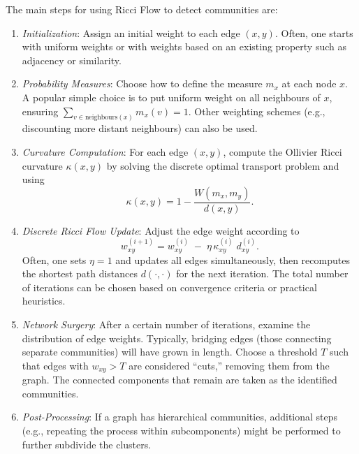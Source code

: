 The main steps for using Ricci Flow to detect communities are:
\begin{enumerate}
    \item \emph{Initialization}: Assign an initial weight to each edge $(x,y)$. Often, one starts with uniform weights or with weights based on an existing property such as adjacency or similarity.
    \item \emph{Probability Measures}: Choose how to define the measure $m_x$ at each node $x$. A popular simple choice is to put uniform weight on all neighbours of $x$, ensuring $\sum_{v \in \text{neighbours}(x)} m_x(v)=1$. Other weighting schemes (e.g., discounting more distant neighbours) can also be used.
    \item \emph{Curvature Computation}: For each edge $(x,y)$, compute the Ollivier Ricci curvature $\kappa(x,y)$ by solving the discrete optimal transport problem and using 
    \begin{equation}
    \kappa(x,y) = 1 - \frac{W(m_x, m_y)}{d(x,y)}.
    \end{equation}
    \item \emph{Discrete Ricci Flow Update}: Adjust the edge weight according to
    \begin{equation}
    w_{xy}^{(i+1)} = w_{xy}^{(i)} \;-\; \eta \,\kappa_{xy}^{(i)} \; d_{xy}^{(i)}.
    \end{equation}
    Often, one sets $\eta=1$ and updates all edges simultaneously, then recomputes the shortest path distances $d(\cdot,\cdot)$ for the next iteration. The total number of iterations can be chosen based on convergence criteria or practical heuristics.
    \item \emph{Network Surgery}: After a certain number of iterations, examine the distribution of edge weights. Typically, bridging edges (those connecting separate communities) will have grown in length. Choose a threshold $T$ such that edges with $w_{xy} > T$ are considered “cuts,” removing them from the graph. The connected components that remain are taken as the identified communities.
    \item \emph{Post-Processing}: If a graph has hierarchical communities, additional steps (e.g., repeating the process within subcomponents) might be performed to further subdivide the clusters.
\end{enumerate}

